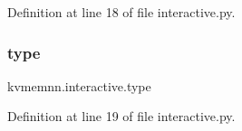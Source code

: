 Definition at line 18 of file interactive.\+py.

\mbox{\label{namespacekvmemnn_1_1interactive_a1698554012c0b91bef3ece564e11f393}} 
\subsubsection{\texorpdfstring{type}{type}}
{\footnotesize\ttfamily kvmemnn.\+interactive.\+type}



Definition at line 19 of file interactive.\+py.

